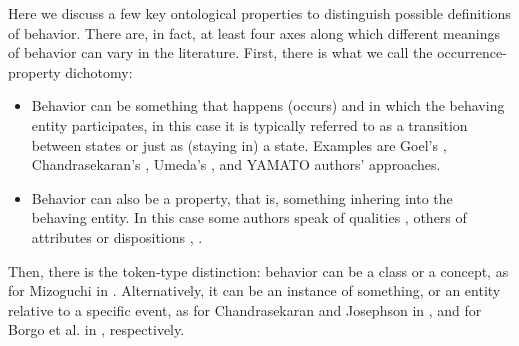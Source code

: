 \documentclass[sw]{iosart2x}
\newcommand{\YAMATO}{\textsc{YAMATO}\xspace}
\newcommand{\stateVarCond}[1]{%
  \ifthenelse{\equal{#1}{fullSingular}}{system condition}{%
    \ifthenelse{\equal{#1}{shortSingular}}{condition}{%
      \ifthenelse{\equal{#1}{fullPlural}}{system conditions}{%
        \ifthenelse{\equal{#1}{shortPlural}}{conditions}{%
          ERROR!%
        }%
      }%
    }%
  }%
}
\newcommand{\TODO}[1]{{%
}}
\begin{document}

Here we discuss a few key ontological properties to distinguish possible definitions of behavior.
There are, in fact, at least four %
axes along which different meanings of behavior can vary in the literature.
First, there is what we call the occurrence-property dichotomy:
\begin{itemize}
  \item Behavior can be something that happens (occurs) and in which the behaving entity participates, 
  in this case it is typically referred to as a transition between states or just as (staying in) a state. 
  Examples are Goel's \cite{goelStructureBehaviorFunction2009}, Chandrasekaran's \cite{chandrasekaranFunctionDeviceRepresentation2000}, Umeda's \cite{umedaFunctionBehaviourStructure1990}, and \YAMATO authors' \cite{mizoguchiFunctionalOntologyArtifacts2009} approaches.
  \item Behavior can also be a property, that is, something inhering into the behaving entity. 
  In this case some authors speak of qualities \cite{borgoFormalOntologicalPerspective2009}, others of attributes or dispositions \cite{vermaasConceptualFrameworkJohn2007}, \cite{geroCategorisingTechnologicalKnowledge2002}.
\end{itemize} 

Then, there is the token-type distinction: behavior can be a class or a concept, as for  Mizoguchi in \cite{mizoguchiFunctionalOntologyArtifacts2009}. Alternatively, it can be an instance of something, or an entity relative to a specific event, as for Chandrasekaran and Josephson in \cite{chandrasekaranFunctionDeviceRepresentation2000}, and for Borgo et al. in \cite{borgoFormalOntologicalPerspective2009}, respectively. 
\end{document}
